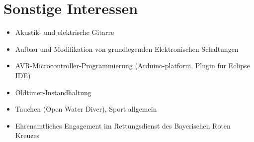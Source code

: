 

\section*{Sonstige Interessen}

\begin{itemize}
	\item Akustik- und elektrische Gitarre
	\item Aufbau und Modifikation von grundlegenden Elektronischen Schaltungen
	\item AVR-Microcontroller-Programmierung (Arduino-platform, Plugin für Eclipse IDE)
	\item Oldtimer-Instandhaltung 
	\item Tauchen (Open Water Diver), Sport allgemein
	\item Ehrenamtliches Engagement im Rettungsdienst des Bayerischen Roten Kreuzes
\end{itemize}